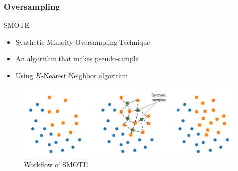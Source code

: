 \documentclass{beamer}
\begin{document}
    \begin{frame}
        \frametitle{Oversampling}

        \begin{block}{SMOTE \cite{SMOTE1}}
            \begin{itemize}
                \item Synthetic Minority Oversampling Technique
                \item An algorithm that makes pseudo-sample
                \item Using $K$-Nearest Neighbor algorithm
            \end{itemize}
        \end{block}

        \begin{figure}
            \includegraphics[width=0.8 \linewidth]{figures/SMOTE.png}
            \caption{Workflow of SMOTE}
        \end{figure}
    \end{frame}
\end{document}
